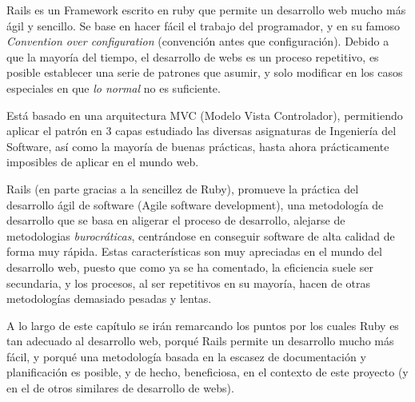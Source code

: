 Rails es un Framework escrito en ruby que permite un desarrollo web mucho más ágil y sencillo. Se base en hacer fácil el trabajo del programador, y en su famoso \emph{Convention over configuration} (convención antes que configuración). Debido a que la mayoría del tiempo, el desarrollo de webs es un proceso repetitivo, es posible establecer una serie de patrones que asumir, y solo modificar en los casos especiales en que \emph{lo normal} no es suficiente.

Está basado en una arquitectura MVC (Modelo Vista Controlador), permitiendo aplicar el patrón en 3 capas estudiado las diversas asignaturas de Ingeniería del Software, así como la mayoría de buenas prácticas, hasta ahora prácticamente imposibles de aplicar en el mundo web. 

Rails (en parte gracias a la sencillez de Ruby), promueve la práctica del desarrollo ágil de software (Agile software development), una metodología de desarrollo que se basa en aligerar el proceso de desarrollo, alejarse de metodologias \emph{burocráticas}, centrándose en conseguir software de alta calidad de forma muy rápida. Estas características son muy apreciadas en el mundo del desarrollo web, puesto que como ya se ha comentado, la eficiencia suele ser secundaria, y los procesos, al ser repetitivos en su mayoría, hacen de otras metodologías demasiado pesadas y lentas.

A lo largo de este capítulo se irán remarcando los puntos por los cuales Ruby es tan adecuado al desarrollo web, porqué Rails permite un desarrollo mucho más fácil, y porqué una metodología basada en la escasez de documentación y planificación es posible, y de hecho, beneficiosa, en el contexto de este proyecto (y en el de otros similares de desarrollo de webs). 


